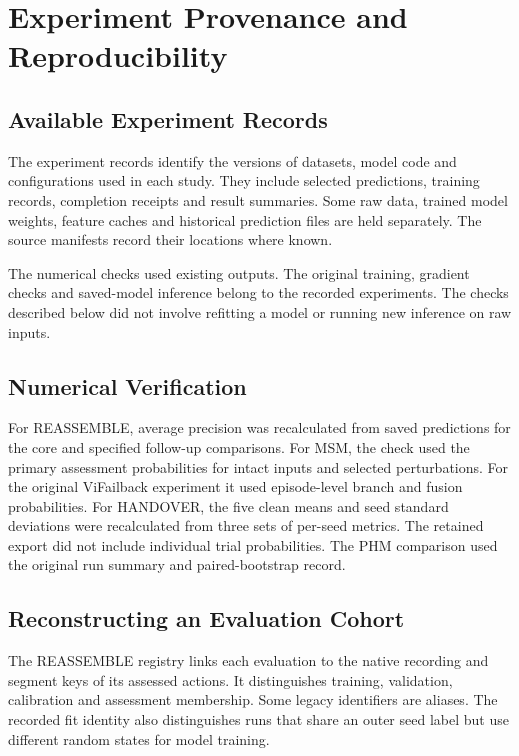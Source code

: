 \chapter{Experiment Provenance and Reproducibility}
\label{app:reproducibility}

\section{Available Experiment Records}
The experiment records identify the versions of datasets, model code and configurations
used in each study. They include selected predictions, training records, completion
receipts and result summaries. Some raw data, trained model weights, feature caches and
historical prediction files are held separately. The source manifests record their
locations where known.

The numerical checks used existing outputs. The original training, gradient checks and
saved-model inference belong to the recorded experiments. The checks described below did
not involve refitting a model or running new inference on raw inputs.

\section{Numerical Verification}
For REASSEMBLE, average precision was recalculated from saved predictions for the core
and specified follow-up comparisons. For MSM, the check used the primary assessment
probabilities for intact inputs and selected perturbations. For the original ViFailback
experiment it used episode-level branch and fusion probabilities. For HANDOVER, the five
clean means and seed standard deviations were recalculated from three sets of per-seed
metrics. The retained export did not include individual trial probabilities.
The PHM comparison used the original run summary and paired-bootstrap record.

\section{Reconstructing an Evaluation Cohort}
The REASSEMBLE registry links each evaluation to the native recording and segment keys
of its assessed actions. It distinguishes training, validation, calibration and
assessment membership. Some legacy identifiers are aliases. The recorded fit identity
also distinguishes runs that share an outer seed label but use different random states
for model training.

